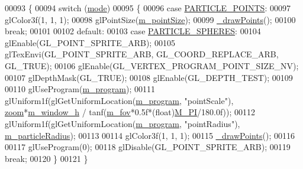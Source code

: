 \begin{DoxyCode}
00093 \{
00094     \textcolor{keywordflow}{switch} (\hyperlink{particles_8cpp_a1ea5d0cb93f22f7d0fdf804bd68c3326}{mode})
00095     \{
00096         \textcolor{keywordflow}{case} \hyperlink{class_particle_renderer_a7b691afffd1abe415cb0ce17fd26f3d5a76d84afc3ec5c09bff035fe798dacbbe}{PARTICLE\_POINTS}:
00097             glColor3f(1, 1, 1);
00098             glPointSize(\hyperlink{class_particle_renderer_a1ca13e546c937cb546c0da19fa853b34}{m\_pointSize});
00099             \hyperlink{class_particle_renderer_a2683c43c010bff7973a977c1953f2bd6}{\_drawPoints}();
00100             \textcolor{keywordflow}{break};
00101 
00102         \textcolor{keywordflow}{default}:
00103         \textcolor{keywordflow}{case} \hyperlink{class_particle_renderer_a7b691afffd1abe415cb0ce17fd26f3d5acc641adfb37c1a267e9f91d128094111}{PARTICLE\_SPHERES}:
00104             glEnable(GL\_POINT\_SPRITE\_ARB);
00105             glTexEnvi(GL\_POINT\_SPRITE\_ARB, GL\_COORD\_REPLACE\_ARB, GL\_TRUE);
00106             glEnable(GL\_VERTEX\_PROGRAM\_POINT\_SIZE\_NV);
00107             glDepthMask(GL\_TRUE);
00108             glEnable(GL\_DEPTH\_TEST);
00109 
00110             glUseProgram(\hyperlink{class_particle_renderer_ab8f0dd1a6e0f4401012bd46ae8940648}{m\_program});
00111             glUniform1f(glGetUniformLocation(\hyperlink{class_particle_renderer_ab8f0dd1a6e0f4401012bd46ae8940648}{m\_program}, \textcolor{stringliteral}{"pointScale"}), 
      \hyperlink{class_particle_renderer_a065df5c32be72505267048490bd0b3cf}{zoom}*\hyperlink{class_particle_renderer_af34b1e93f6a7f22774a6473c52027d77}{m\_window\_h} / tanf(\hyperlink{class_particle_renderer_a0aed003bd557a3c32ca7d2ca89fc59f7}{m\_fov}*0.5f*(\textcolor{keywordtype}{float})\hyperlink{render__particles_8cpp_ae71449b1cc6e6250b91f539153a7a0d3}{M\_PI}/180.0f));
00112             glUniform1f(glGetUniformLocation(\hyperlink{class_particle_renderer_ab8f0dd1a6e0f4401012bd46ae8940648}{m\_program}, \textcolor{stringliteral}{"pointRadius"}), 
      \hyperlink{class_particle_renderer_aab5ee3cd769a64c45dc9714aabdb0ee2}{m\_particleRadius});
00113 
00114             glColor3f(1, 1, 1);
00115             \hyperlink{class_particle_renderer_a2683c43c010bff7973a977c1953f2bd6}{\_drawPoints}();
00116 
00117             glUseProgram(0);
00118             glDisable(GL\_POINT\_SPRITE\_ARB);
00119             \textcolor{keywordflow}{break};
00120     \}
00121 \}
\end{DoxyCode}


